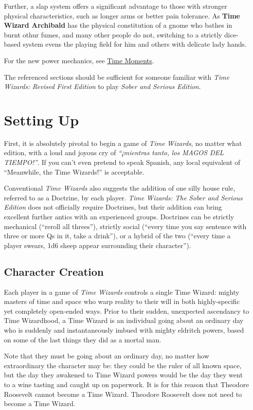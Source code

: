 \documentclass{article}
\newcommand{\twsse}{\emph{Time Wizards: The Sober and Serious Edition}}
\newcommand{\tw}{\emph{Time Wizards}}
\newcommand{\sse}{\emph{Sober and Serious Edition}}
\newcommand{\namefag}[2][]{{\color{anongreen} \textbf{#2}#1}}
\begin{document}
Further, a slap system offers a significant advantage to those with stronger physical
characteristics, such as longer arms or better pain tolerance. As \namefag{Time Wizard Archibald}
has the physical constitution of a gnome who bathes in burnt othur fumes, and many other people
do not, switching to a strictly dice-based system evens the playing field for him and others with
delicate lady hands.

For the new power mechanics, see \hyperref[sec:time-moment]{Time Moments}.

The referenced sections should be sufficient for someone familiar with \emph{Time Wizards:
Revised First Edition} to play \sse{}.

\section{Setting Up}
First, it is absolutely pivotal to begin a game of \tw{}, no matter what edition, with a loud
and joyous cry of \emph{``¡mientras tanto, los MAGOS DEL TIEMPO!''}. If you can't even pretend
to speak Spanish, any local equivalent of ``Meanwhile, the Time Wizards!'' is acceptable.

Conventional \tw{} also suggests the addition of one silly house rule, referred to as a Doctrine,
by each player. \twsse{} does not officially require Doctrines, but their addition can bring
excellent further antics with an experienced groups. Doctrines can be strictly mechanical
(``reroll all threes''), strictly social (``every time you say sentence with three or more Qs
in it, take a drink''), or a hybrid of the two (``every time a player swears, 1d6 sheep appear
surrounding their character'').

\subsection{Character Creation} \label{ssec:creation}
Each player in a game of \tw{} controls a single Time Wizard: mighty masters of time and space
who warp reality to their will in both highly-specific yet completely open-ended ways. Prior to
their sudden, unexpected ascendancy to Time Wizardhood, a Time Wizard is an individual going
about an ordinary day who is suddenly and instantaneously imbued with mighty eldritch powers,
based on some of the last things they did as a mortal man.

Note that they must be going about an ordinary day, no matter how extraordinary the character
may be: they could be the ruler of all known space, but the day they awakened to Time Wizard
powers would be the day they went to a wine tasting and caught up on paperwork. It is for this
reason that Theodore Roosevelt cannot become a Time Wizard. Theodore Roosevelt does not need to
become a Time Wizard.
\end{document}
